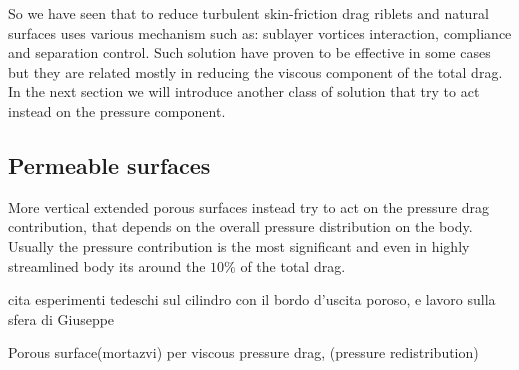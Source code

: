 So we have seen that to reduce turbulent skin-friction drag riblets and natural surfaces uses various mechanism such as: sublayer vortices interaction, compliance and separation control.
Such solution have proven to be effective in some cases but they are related mostly in reducing the viscous component of the total drag.
In the next section we will introduce another class of solution that try to act instead on the pressure component.


\subsection{Permeable surfaces}

More vertical extended porous surfaces instead try to act on the pressure drag contribution, that depends on the overall pressure distribution on the body.
Usually the pressure contribution is the most significant and even in highly streamlined body its around the $10\%$ of the total drag.



cita esperimenti tedeschi sul cilindro con il bordo d'uscita poroso, e lavoro sulla sfera di Giuseppe

Porous surface(mortazvi) per viscous pressure drag, (pressure redistribution)